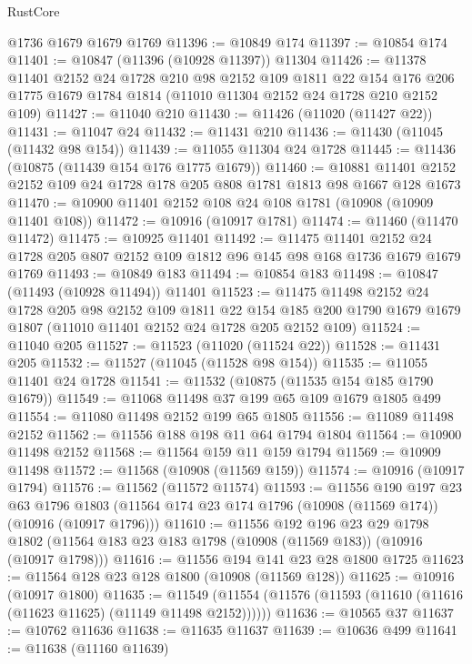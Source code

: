 \begin{lexlean}{RustCore}
\begin{coremodule}
    @1736
    @1679
    @1679
    @1769
@11396 := @10849 @174
@11397 := @10854 @174
@11401 := @10847 (@11396 (@10928 @11397)) @11304
@11426 := @11378
    @11401
    @2152
    @24
    @1728
    @210
    @98
    @2152
    @109
    @1811
    @22
    @154
    @176
    @206
    @1775
    @1679
    @1784
    @1814
    (@11010 @11304 @2152 @24 @1728 @210 @2152 @109)
@11427 := @11040 @210
@11430 := @11426 (@11020 (@11427 @22))
@11431 := @11047 @24
@11432 := @11431 @210
@11436 := @11430 (@11045 (@11432 @98 @154))
@11439 := @11055 @11304 @24 @1728
@11445 := @11436 (@10875 (@11439 @154 @176 @1775 @1679))
@11460 := @10881 @11401 @2152 @2152 @109 @24 @1728 @178 @205 @808 @1781 @1813 @98 @1667 @128 @1673
@11470 := @10900 @11401 @2152 @108 @24 @108 @1781 (@10908 (@10909 @11401 @108))
@11472 := @10916 (@10917 @1781)
@11474 := @11460 (@11470 @11472)
@11475 := @10925 @11401
@11492 := @11475
    @11401
    @2152
    @24
    @1728
    @205
    @807
    @2152
    @109
    @1812
    @96
    @145
    @98
    @168
    @1736
    @1679
    @1679
    @1769
@11493 := @10849 @183
@11494 := @10854 @183
@11498 := @10847 (@11493 (@10928 @11494)) @11401
@11523 := @11475
    @11498
    @2152
    @24
    @1728
    @205
    @98
    @2152
    @109
    @1811
    @22
    @154
    @185
    @200
    @1790
    @1679
    @1679
    @1807
    (@11010 @11401 @2152 @24 @1728 @205 @2152 @109)
@11524 := @11040 @205
@11527 := @11523 (@11020 (@11524 @22))
@11528 := @11431 @205
@11532 := @11527 (@11045 (@11528 @98 @154))
@11535 := @11055 @11401 @24 @1728
@11541 := @11532 (@10875 (@11535 @154 @185 @1790 @1679))
@11549 := @11068 @11498 @37 @199 @65 @109 @1679 @1805 @499
@11554 := @11080 @11498 @2152 @199 @65 @1805
@11556 := @11089 @11498 @2152
@11562 := @11556 @188 @198 @11 @64 @1794 @1804
@11564 := @10900 @11498 @2152
@11568 := @11564 @159 @11 @159 @1794
@11569 := @10909 @11498
@11572 := @11568 (@10908 (@11569 @159))
@11574 := @10916 (@10917 @1794)
@11576 := @11562 (@11572 @11574)
@11593 := @11556
    @190
    @197
    @23
    @63
    @1796
    @1803
    (@11564 @174 @23 @174 @1796 (@10908 (@11569 @174)) (@10916 (@10917 @1796)))
@11610 := @11556
    @192
    @196
    @23
    @29
    @1798
    @1802
    (@11564 @183 @23 @183 @1798 (@10908 (@11569 @183)) (@10916 (@10917 @1798)))
@11616 := @11556 @194 @141 @23 @28 @1800 @1725
@11623 := @11564 @128 @23 @128 @1800 (@10908 (@11569 @128))
@11625 := @10916 (@10917 @1800)
@11635 := @11549 (@11554 (@11576 (@11593 (@11610 (@11616 (@11623 @11625) (@11149 @11498 @2152))))))
@11636 := @10565 @37
@11637 := @10762 @11636
@11638 := @11635 @11637
@11639 := @10636 @499
@11641 := @11638 (@11160 @11639)

\end{coremodule}
\end{lexlean}
